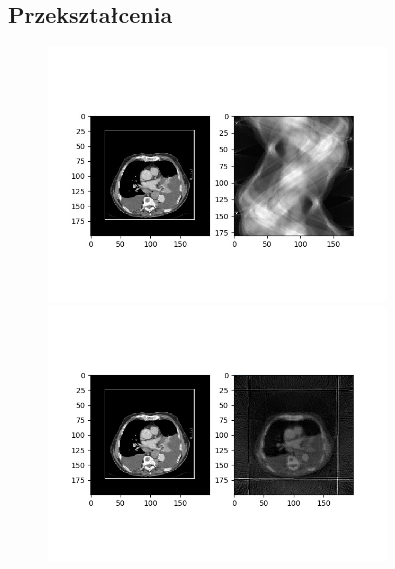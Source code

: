 \documentclass{article}
\begin{document}
\subsection{Przekształcenia}
\begin{figure}[H]
\begin{center}
\includegraphics[width=0.8\textwidth]{./something/sinogram.jpg}
\includegraphics[width=0.8\textwidth]{./something/reconstructedImg2.png}
\end{center}
\end{figure}
\end{document}
